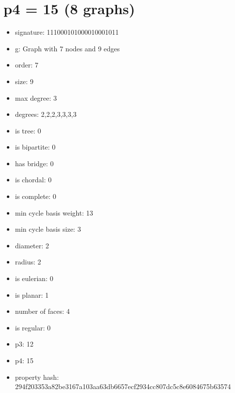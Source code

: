 \chapter{p4 = 15 (8 graphs)}
\newpage\begin{figure}
\end{figure}
\begin{itemize}
\item signature: 111000101000010001011
\item g: Graph with 7 nodes and 9 edges
\item order: 7
\item size: 9
\item max degree: 3
\item degrees: 2,2,2,3,3,3,3
\item is tree: 0
\item is bipartite: 0
\item has bridge: 0
\item is chordal: 0
\item is complete: 0
\item min cycle basis weight: 13
\item min cycle basis size: 3
\item diameter: 2
\item radius: 2
\item is eulerian: 0
\item is planar: 1
\item number of faces: 4
\item is regular: 0
\item p3: 12
\item p4: 15
\item property hash: 294f203353a82be3167a103aa63db6657ecf2934cc807dc5c8e6084675b63574
\end{itemize}
\newpage
